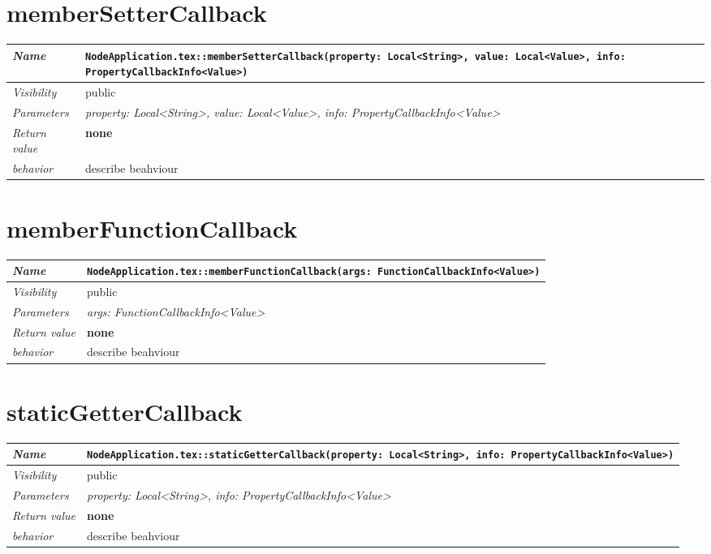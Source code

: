  \section{memberSetterCallback}
\begin{longtable}{p{3cm} @{\hskip 1cm} p{12cm}}
 \hline
\textit{Name} & \texttt{NodeApplication.tex::memberSetterCallback(property: Local<String>, value: Local<Value>, info: PropertyCallbackInfo<Value>)}\\
\hline
 \textit{Visibility} & public\\
\hline
\textit{Parameters} & \textit{property: Local<String>, value: Local<Value>, info: PropertyCallbackInfo<Value>}\\
\hline
\textit{Return value} & \textbf{none}\\
  \hline
 \textit{behavior} & describe beahviour \\
\hline
\end{longtable} \pagebreak
 \section{memberFunctionCallback}
\begin{longtable}{p{3cm} @{\hskip 1cm} p{12cm}}
 \hline
\textit{Name} & \texttt{NodeApplication.tex::memberFunctionCallback(args: FunctionCallbackInfo<Value>)}\\
\hline
 \textit{Visibility} & public\\
\hline
\textit{Parameters} & \textit{args: FunctionCallbackInfo<Value>}\\
\hline
\textit{Return value} & \textbf{none}\\
  \hline
 \textit{behavior} & describe beahviour \\
\hline
\end{longtable} \pagebreak
 \section{staticGetterCallback}
\begin{longtable}{p{3cm} @{\hskip 1cm} p{12cm}}
 \hline
\textit{Name} & \texttt{NodeApplication.tex::staticGetterCallback(property: Local<String>, info: PropertyCallbackInfo<Value>)}\\
\hline
 \textit{Visibility} & public\\
\hline
\textit{Parameters} & \textit{property: Local<String>, info: PropertyCallbackInfo<Value>}\\
\hline
\textit{Return value} & \textbf{none}\\
  \hline
 \textit{behavior} & describe beahviour \\
\hline
\end{longtable} \pagebreak
